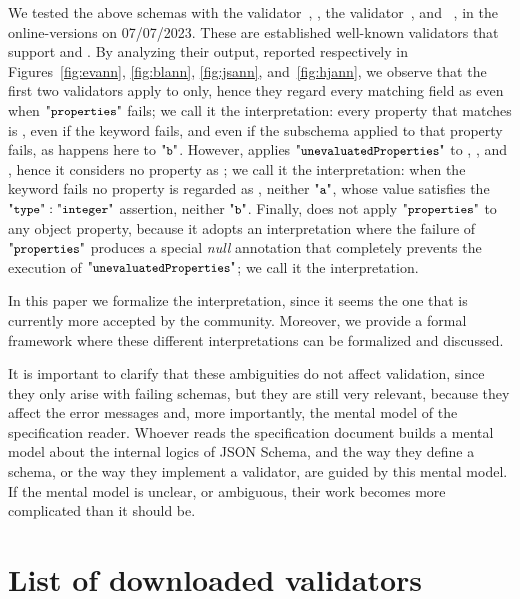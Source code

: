 \begin{toappendix}
\begin{example}
We tested the above schemas with the  {\JE} validator~\citep{jsever},  {\BL} \citep{bl}, the {\JSD} validator~\citep{jsdev}, and {\HJ}~\citep{hyperjump},
in the online-versions on 07/07/2023.
These are established well-known validators that support {\DNineteen} and {\DTwenty}.
By analyzing their output, reported respectively in Figures~\ref{fig:evann}, \ref{fig:blann}, \ref{fig:jsann}, and~\ref{fig:hjann}, we observe that the first two validators apply 
 {\qunIts} to  only, hence they regard every matching field as {\evaluated} even when $\qprops$ fails;
 we call it the {\kfailuretol} interpretation: every property that matches is {\evaluated}, even if the keyword fails,
 and even if the subschema applied to that property fails, as happens here to $\qkw{b}$.
 However, {\JSD} applies $\qunProps$ to , , and , 
 hence it considers no property as {\evaluated};  we call it the {\successonly} interpretation:
 when the keyword fails no property is regarded as {\evaluated}, neither $\qkw{a}$, whose value satisfies
 the $\qtype: \qinteger$ assertion, neither $\qkw{b}$. 
 Finally, {\HJ} does not apply $\qprops$ to any object property, because it adopts an interpretation where the failure
 of $\qprops$ produces a special \emph{null} annotation that completely prevents the execution of 
 $\qunProps$; we call it the {\nullannotation} interpretation.
\end{example}

In this paper we formalize the {\kfailuretol} interpretation, since it seems the one that is currently more
accepted by the community. Moreover, we provide a formal framework where these different interpretations
can be formalized and discussed.

It is important to clarify that these ambiguities do not affect validation, since they only arise with failing schemas, but 
they are still very relevant, because they affect the error messages and, more importantly,
the mental model of the specification reader. Whoever reads the specification document  builds a mental model about the internal logics of JSON Schema, and the way they define a schema, or the way they implement a validator, are guided by 
this mental model.
If the mental model is unclear, or ambiguous, their work becomes more complicated than it should be.


\section{List of downloaded validators}\label{app:validators}


\end{toappendix}
